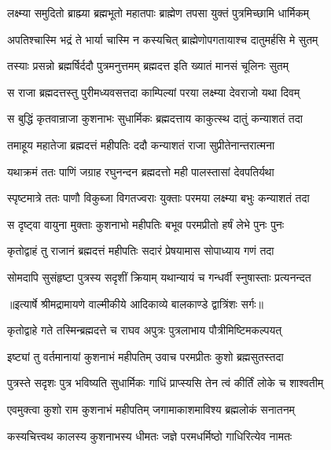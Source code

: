 \twolineshloka
{लक्ष्म्या समुदितो ब्राह्म्या ब्रह्मभूतो महातपाः}
{ब्राह्मेण तपसा युक्तं पुत्रमिच्छामि धार्मिकम्} %

\twolineshloka
{अपतिश्चास्मि भद्रं ते भार्या चास्मि न कस्यचित्}
{ब्राह्मेणोपगतायाश्च दातुमर्हसि मे सुतम्} %

\twolineshloka
{तस्याः प्रसन्नो ब्रह्मर्षिर्ददौ पुत्रमनुत्तमम्}
{ब्रह्मदत्त इति ख्यातं मानसं चूलिनः सुतम्} %

\twolineshloka
{स राजा ब्रह्मदत्तस्तु पुरीमध्यवसत्तदा}
{काम्पिल्यां परया लक्ष्म्या देवराजो यथा दिवम्} %

\twolineshloka
{स बुद्धिं कृतवान्राजा कुशनाभः सुधार्मिकः}
{ब्रह्मदत्ताय काकुत्स्थ दातुं कन्याशतं तदा} %

\twolineshloka
{तमाहूय महातेजा ब्रह्मदत्तं महीपतिः}
{ददौ कन्याशतं राजा सुप्रीतेनान्तरात्मना} %

\twolineshloka
{यथाक्रमं ततः पाणिं जग्राह रघुनन्दन}
{ब्रह्मदत्तो मही पालस्तासां देवपतिर्यथा} %

\twolineshloka
{स्पृष्टमात्रे ततः पाणौ विकुब्जा विगतज्वराः}
{युक्ताः परमया लक्ष्म्या बभुः कन्याशतं तदा} %

\twolineshloka
{स दृष्ट्वा वायुना मुक्ताः कुशनाभो महीपतिः}
{बभूव परमप्रीतो हर्षं लेभे पुनः पुनः} %

\twolineshloka
{कृतोद्वाहं तु राजानं ब्रह्मदत्तं महीपतिः}
{सदारं प्रेषयामास सोपाध्याय गणं तदा} %

\twolineshloka
{सोमदापि सुसंहृष्टा पुत्रस्य सदृशीं क्रियाम्}
{यथान्यायं च गन्धर्वी स्नुषास्ताः प्रत्यनन्दत} %


{॥इत्यार्षे श्रीमद्रामायणे वाल्मीकीये आदिकाव्ये बालकाण्डे द्वात्रिंशः सर्गः॥}


\twolineshloka
{कृतोद्वाहे गते तस्मिन्ब्रह्मदत्ते च राघव}
{अपुत्रः पुत्रलाभाय पौत्रीमिष्टिमकल्पयत्} %

\twolineshloka
{इष्ट्यां तु वर्तमानायां कुशनाभं महीपतिम्}
{उवाच परमप्रीतः कुशो ब्रह्मसुतस्तदा} %

\twolineshloka
{पुत्रस्ते सदृशः पुत्र भविष्यति सुधार्मिकः}
{गाधिं प्राप्स्यसि तेन त्वं कीर्तिं लोके च शाश्वतीम्} %

\twolineshloka
{एवमुक्त्वा कुशो राम कुशनाभं महीपतिम्}
{जगामाकाशमाविश्य ब्रह्मलोकं सनातनम्} %

\twolineshloka
{कस्यचित्त्वथ कालस्य कुशनाभस्य धीमतः}
{जज्ञे परमधर्मिष्ठो गाधिरित्येव नामतः} %

